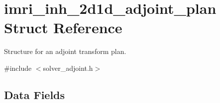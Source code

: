 \hypertarget{structimri__inh__2d1d__adjoint__plan}{\section{imri\-\_\-inh\-\_\-2d1d\-\_\-adjoint\-\_\-plan Struct Reference}
\label{structimri__inh__2d1d__adjoint__plan}
}


Structure for an adjoint transform plan.  




{\ttfamily \#include $<$solver\-\_\-adjoint.\-h$>$}

\subsection*{Data Fields}

